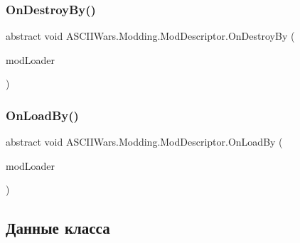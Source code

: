 \subsubsection{\texorpdfstring{On\+Destroy\+By()}{OnDestroyBy()}}
{\footnotesize\ttfamily abstract void A\+S\+C\+I\+I\+Wars.\+Modding.\+Mod\+Descriptor.\+On\+Destroy\+By (\begin{DoxyParamCaption}\item[{\hyperlink{class_a_s_c_i_i_wars_1_1_modding_1_1_mod_loader}{Mod\+Loader}}]{mod\+Loader }\end{DoxyParamCaption})\hspace{0.3cm}{\ttfamily [pure virtual]}}

\hypertarget{class_a_s_c_i_i_wars_1_1_modding_1_1_mod_descriptor_a087f1c678b77fd17441f1cfe32d43878}{}\label{class_a_s_c_i_i_wars_1_1_modding_1_1_mod_descriptor_a087f1c678b77fd17441f1cfe32d43878} 
\subsubsection{\texorpdfstring{On\+Load\+By()}{OnLoadBy()}}
{\footnotesize\ttfamily abstract void A\+S\+C\+I\+I\+Wars.\+Modding.\+Mod\+Descriptor.\+On\+Load\+By (\begin{DoxyParamCaption}\item[{\hyperlink{class_a_s_c_i_i_wars_1_1_modding_1_1_mod_loader}{Mod\+Loader}}]{mod\+Loader }\end{DoxyParamCaption})\hspace{0.3cm}{\ttfamily [pure virtual]}}



\subsection{Данные класса}
\hypertarget{class_a_s_c_i_i_wars_1_1_modding_1_1_mod_descriptor_aa566f129182ce06660d9cdcc0c5ac46c}{}\label{class_a_s_c_i_i_wars_1_1_modding_1_1_mod_descriptor_aa566f129182ce06660d9cdcc0c5ac46c} 

